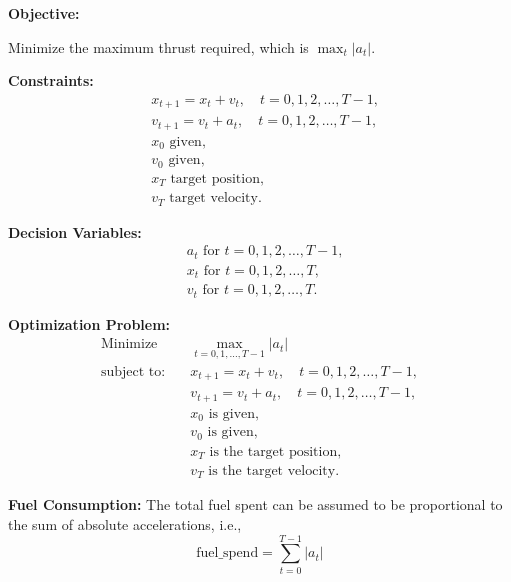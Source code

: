 \documentclass{article}
\begin{document}
\textbf{Objective:} 

Minimize the maximum thrust required, which is \(\max_t |a_t|\). 

\textbf{Constraints:}
\begin{align*}
& x_{t+1} = x_t + v_t, \quad t = 0, 1, 2, \ldots, T-1, \\
& v_{t+1} = v_t + a_t, \quad t = 0, 1, 2, \ldots, T-1, \\
& x_0 \text{ given}, \\
& v_0 \text{ given}, \\
& x_T \text{ target position}, \\
& v_T \text{ target velocity}.
\end{align*}

\textbf{Decision Variables:}
\begin{align*}
& a_t \text{ for } t = 0, 1, 2, \ldots, T-1, \\
& x_t \text{ for } t = 0, 1, 2, \ldots, T, \\
& v_t \text{ for } t = 0, 1, 2, \ldots, T.
\end{align*}

\textbf{Optimization Problem:}
\begin{align*}
\text{Minimize} \quad & \max_{t=0, 1, \ldots, T-1} |a_t| \\
\text{subject to:} \quad & x_{t+1} = x_t + v_t, \quad t = 0, 1, 2, \ldots, T-1, \\
& v_{t+1} = v_t + a_t, \quad t = 0, 1, 2, \ldots, T-1, \\
& x_0 \text{ is given}, \\
& v_0 \text{ is given}, \\
& x_T \text{ is the target position}, \\
& v_T \text{ is the target velocity}.
\end{align*}

\textbf{Fuel Consumption:}
The total fuel spent can be assumed to be proportional to the sum of absolute accelerations, i.e.,
\[
\text{fuel\_spend} = \sum_{t=0}^{T-1} |a_t|
\]
\end{document}
